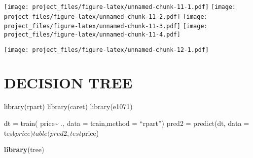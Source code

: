 \documentclass[
]{article}
\newenvironment{Shaded}{\begin{snugshade}}{\end{snugshade}}
\newcommand{\CommentTok}[1]{\textcolor[rgb]{0.56,0.35,0.01}{\textit{#1}}}
\newcommand{\DataTypeTok}[1]{\textcolor[rgb]{0.13,0.29,0.53}{#1}}
\newcommand{\DecValTok}[1]{\textcolor[rgb]{0.00,0.00,0.81}{#1}}
\newcommand{\FloatTok}[1]{\textcolor[rgb]{0.00,0.00,0.81}{#1}}
\newcommand{\KeywordTok}[1]{\textcolor[rgb]{0.13,0.29,0.53}{\textbf{#1}}}
\newcommand{\NormalTok}[1]{#1}
\newcommand{\OperatorTok}[1]{\textcolor[rgb]{0.81,0.36,0.00}{\textbf{#1}}}
\newcommand{\StringTok}[1]{\textcolor[rgb]{0.31,0.60,0.02}{#1}}
\begin{document}
\texttt{[image: project\_files/figure-latex/unnamed-chunk-11-1.pdf]}
\texttt{[image: project\_files/figure-latex/unnamed-chunk-11-2.pdf]}
\texttt{[image: project\_files/figure-latex/unnamed-chunk-11-3.pdf]}
\texttt{[image: project\_files/figure-latex/unnamed-chunk-11-4.pdf]}

\begin{Shaded}
\end{Shaded}

\texttt{[image: project\_files/figure-latex/unnamed-chunk-12-1.pdf]}

\hypertarget{decision-tree}{%
\section{DECISION TREE}\label{decision-tree}}

library(rpart) library(caret) library(e1071)

dt = train( price\textasciitilde{} ., data = train,method = ``rpart'')
pred2 = predict(dt, data = test\(price) table(pred2, test\)price)

\begin{Shaded}
\begin{Highlighting}[]
\KeywordTok{library}\NormalTok{(tree)}
\end{Highlighting}
\end{Shaded}
\end{document}
